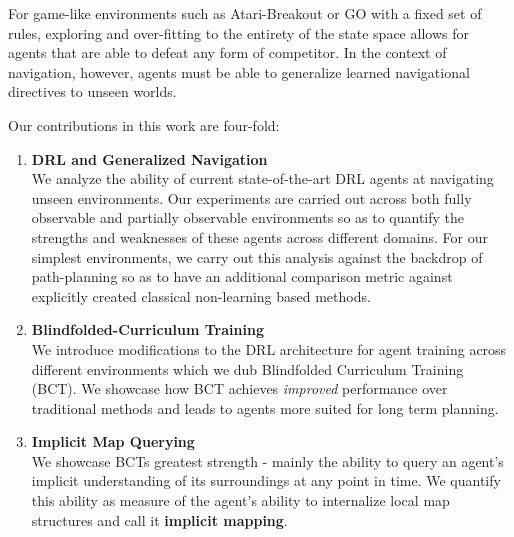 For game-like environments such as Atari-Breakout or GO with a fixed set of rules, exploring and over-fitting to the entirety of the state space allows for agents that are able to defeat any form of competitor. In the context of navigation, however, agents must be able to generalize learned navigational directives to unseen worlds. 
 
Our contributions in this work are four-fold:

\begin{enumerate}
    \item \textbf{DRL and Generalized Navigation}\\
        We analyze the ability of current state-of-the-art DRL agents at navigating unseen environments. Our experiments are carried out across both fully observable and partially observable environments so as to quantify the strengths and weaknesses of these agents across different domains. For our simplest environments, we carry out this analysis against the backdrop of path-planning so as to have an additional comparison metric against explicitly created classical non-learning based methods. 


    \item \textbf{Blindfolded-Curriculum Training}\\
        We introduce modifications to the DRL architecture for agent training across different environments which we dub Blindfolded Curriculum Training (BCT). We showcase how BCT achieves \textit{improved} performance over traditional methods and leads to agents more suited for long term planning.
    \item \textbf{Implicit Map Querying}\\
        We showcase BCTs greatest strength - mainly the ability to query an agent's implicit understanding of its surroundings at any point in time. We quantify this ability as measure of the agent's ability to internalize local map structures and call it \textbf{implicit mapping}. 
\end{enumerate}

